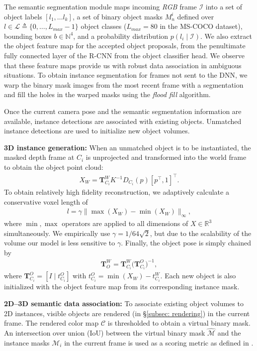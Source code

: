 The semantic segmentation module maps incoming \textit{RGB} frame \(\mathcal{I}\) into a set of object labels $[l_1, \dots l_k]$, a set of binary object masks $M_n^i$ defined over $l \in \mathcal{L} \triangleq \{0, \dots, L_{max}-1\}$ object classes ($L_{max}=80$ in the MS-COCO dataset), bounding boxes $b \in \mathbb{N}^4$, and a probability distribution $p(l_i \mid \mathcal{I})$. We also extract the object feature map for the accepted object proposals, from the penultimate fully connected layer of the R-CNN from the object classifier head. We observe that these feature maps provide us with robust data association in ambiguous situations.
%
To obtain instance segmentation for frames not sent to the DNN, we warp the binary mask images from the most recent frame with a segmentation and fill the holes in the warped masks using the \textit{flood fill} algorithm.

Once the current camera pose and the semantic segmentation information are available, instance detections are associated with existing objects. Unmatched instance detections are used to initialize new object volumes.

\textbf{3D instance generation:} When an unmatched object is to be instantiated, the masked depth frame at $C_i$ is unprojected and transformed into the world frame to obtain the object point cloud:
\begin{align}
X_{W} = \mathbf{T}^W_{C_i} K^{-1} D_{C_i}(p) [p^\top, 1]^\top.
\end{align}
To obtain relatively high fidelity reconstruction, we adaptively calculate a conservative voxel length of
\begin{align}
    l = \gamma \| \max(X_W) - \min(X_W) \|_{\infty},
\end{align}
where $\min, \max$ operators are applied to all dimensions of $X \in \mathbb{R}^3$ simultaneously. We empirically use $\gamma = 1 / 64\sqrt{2}$, but due to the scalability of the volume our model is less sensitive to $\gamma$.
Finally, the object pose is simply chained by
\begin{align}
    \mathbf{T}_{O}^W = \mathbf{T}_{C_i}^{W} \bigg({\mathbf{T}_{C_i}^O}\bigg)^{-1},
\end{align}
where $\mathbf{T}_{C_i}^O = [I \mid t_{C_i}^O]$ with $t_{C_i}^O = \min(X_W) - t_{C_i}^W $. Each new object is also initialized with the object feature map from its corresponding instance mask.

\textbf{2D--3D semantic data association:}
To associate existing object volumes to 2D instances, visible objects are rendered (in \S\ref{subsec: rendering}) in the current frame. The rendered color map $\mathcal{C}$ is thresholded to obtain a virtual binary mask. An intersection over union (IoU) between the virtual binary mask $\hat{\mathcal{M}}$ and the instance masks $\mathcal{M}_i$ in the current frame is used as a scoring metric as defined in \cite{mccormacFusionVolumetricObjectLevel2018}.

